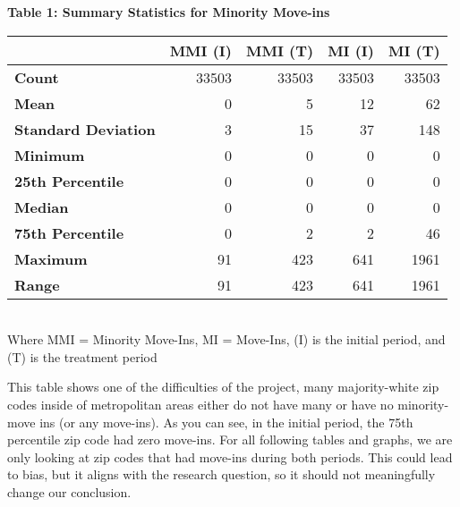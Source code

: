\documentclass[11pt]{article}
\begin{document}
\begin{table}[!h]
    \centering
    \textbf{Table 1: Summary Statistics for Minority Move-ins}\\
    \label{tab:mmi_stats}
    \begin{tabular}{l|rrrr}
    \toprule
    & \textbf{MMI (I)} & \textbf{MMI (T)} & \textbf{MI (I)} & \textbf{MI (T)} \\
    \midrule
    \textbf{Count} & 33503 & 33503 & 33503 & 33503 \\
    \textbf{Mean} & 0 & 5 & 12 & 62 \\
    \textbf{Standard Deviation} & 3 & 15 & 37 & 148 \\
    \textbf{Minimum} & 0 & 0 & 0 & 0 \\
    \textbf{25th Percentile} & 0 & 0 & 0 & 0 \\
    \textbf{Median} & 0 & 0 & 0 & 0 \\
    \textbf{75th Percentile} & 0 & 2 & 2 & 46 \\
    \textbf{Maximum} & 91 & 423 & 641 & 1961 \\
    \textbf{Range} & 91 & 423 & 641 & 1961 \\
    \bottomrule
    \end{tabular}\\
    Where MMI = Minority Move-Ins, MI = Move-Ins, (I) is the initial period, and (T) is the treatment period
    \end{table}

    This table shows one of the difficulties of the project, many
majority-white zip codes inside of metropolitan areas either do not have
many or have no minority-move ins (or any move-ins). As you can see, in
the initial period, the 75th percentile zip code had zero move-ins. For
all following tables and graphs, we are only looking at zip codes that
had move-ins during both periods. This could lead to bias, but it aligns
with the research question, so it should not meaningfully change our
conclusion.
\end{document}
